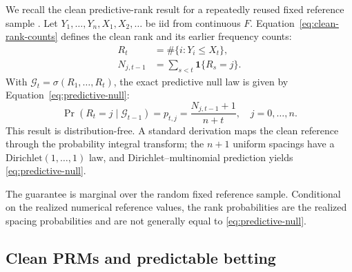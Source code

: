 We recall the clean predictive-rank result for a repeatedly reused fixed reference sample \cite{KuangXia2026}. Let \(Y_1,\ldots,Y_n,X_1,X_2,\ldots\) be iid from continuous \(F\). Equation~\eqref{eq:clean-rank-counts} defines the clean rank and its earlier frequency counts:
\begin{equation}
\begin{aligned}
R_t &= \#\{i:Y_i\le X_t\},\\
N_{j,t-1} &= \sum_{s<t}\mathbf 1\{R_s=j\}.
\end{aligned}
\label{eq:clean-rank-counts}
\end{equation}
With \(\mathcal G_t=\sigma(R_1,\ldots,R_t)\), the exact predictive null law is given by Equation~\eqref{eq:predictive-null}:
\begin{equation}
  \Pr(R_t=j\mid\mathcal G_{t-1})
  =
  p_{t,j}
  =
  \frac{N_{j,t-1}+1}{n+t},
  \quad j=0,\ldots,n.
  \label{eq:predictive-null}
\end{equation}
This result is distribution-free. A standard derivation maps the clean reference through the probability integral transform; the \(n+1\) uniform spacings have a \(\mathrm{Dirichlet}(1,\ldots,1)\) law, and Dirichlet--multinomial prediction yields \eqref{eq:predictive-null}.

The guarantee is marginal over the random fixed reference sample. Conditional on the realized numerical reference values, the rank probabilities are the realized spacing probabilities and are not generally equal to \eqref{eq:predictive-null}.

\subsection{Clean PRMs and predictable betting}


